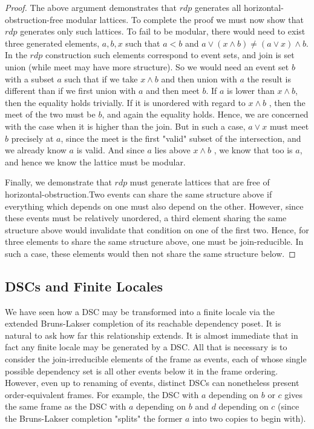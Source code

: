 \documentclass[hoptionsi,review,format=acmsmall]{acmart}
\theoremstyle{definition}
\begin{document}
\begin{proof}
The above argument demonstrates that \(rdp\) generates all horizontal-obstruction-free modular lattices. To complete the proof we must now show that \(rdp\) generates only such lattices. To fail to be modular, there would need to exist three generated elements, \(a, b, x\) such that \(a < b\) and \(a \vee (x \wedge b) \neq (a \vee x) \wedge b\). In the \(rdp\) construction such elements correspond to event sets, and join is set union (while meet may have more structure). So we would need an event set \(b\) with a subset \(a\) such that if we take  \(x \wedge b\) and then union with \(a\) the result is different than if we first union with \(a\) and then meet \(b\). If \(a\) is lower than \(x \wedge b\), then the equality holds trivially. If it is unordered with regard to \(x \wedge b\) , then the meet of the two must be \(b\), and again the equality holds. Hence, we are concerned with the case when it is higher than the join. But in such a case, \(a \vee x\)  must meet \(b\) precisely at \(a\), since the meet is the first "valid" subset of the intersection, and we already know \(a\) is valid. And since \(a\) lies above \(x \wedge b\) , we know that too is \(a\), and hence we know the lattice must be modular.

Finally, we demonstrate that \(rdp\) must generate lattices that are free of horizontal-obstruction.Two events can share the same structure above if everything which depends on one must also depend on the other. However, since these events must be relatively unordered, a third element sharing the same structure above would invalidate that condition on one of the first two. Hence, for three elements to share the same structure above, one must be join-reducible. In such a case, these elements would then not share the same structure below.

\end{proof}


\subsection{DSCs and Finite Locales}

We have seen how a DSC may be transformed into a finite locale via the extended Bruns-Lakser completion of its reachable dependency poset. It is natural to ask how far this relationship extends. It is almost immediate that in fact any finite locale may be generated by a DSC. All that is necessary is to consider the join-irreducible elements of the frame as events, each of whose single possible dependency set is all other events below it in the frame ordering. However, even up to renaming of events, distinct DSCs can nonetheless present order-equivalent frames. For example, the DSC with \(a\) depending on \(b\) or \(c\) gives the same frame as the DSC with \(a\) depending on \(b\) and \(d\) depending on \(c\) (since the Bruns-Lakser completion "splits" the former \(a\) into two copies to begin with). 
\end{document}
